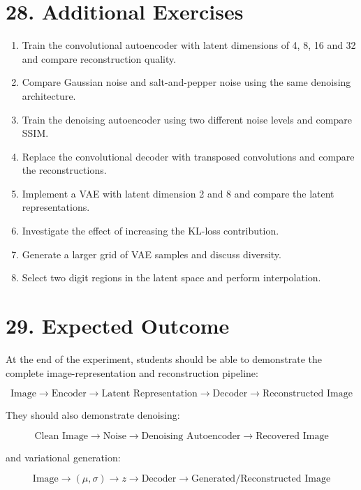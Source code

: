 \documentclass[10pt]{article}
\begin{document}
\section*{28. Additional Exercises}

\begin{enumerate}
\item Train the convolutional autoencoder with latent dimensions of 4, 8, 16
and 32 and compare reconstruction quality.
\item Compare Gaussian noise and salt-and-pepper noise using the same denoising
architecture.
\item Train the denoising autoencoder using two different noise levels and
compare SSIM.
\item Replace the convolutional decoder with transposed convolutions and
compare the reconstructions.
\item Implement a VAE with latent dimension 2 and 8 and compare the latent
representations.
\item Investigate the effect of increasing the KL-loss contribution.
\item Generate a larger grid of VAE samples and discuss diversity.
\item Select two digit regions in the latent space and perform interpolation.
\end{enumerate}

\section*{29. Expected Outcome}

At the end of the experiment, students should be able to demonstrate the
complete image-representation and reconstruction pipeline:

\[
\boxed{
\text{Image}
\rightarrow
\text{Encoder}
\rightarrow
\text{Latent Representation}
\rightarrow
\text{Decoder}
\rightarrow
\text{Reconstructed Image}
}
\]

They should also demonstrate denoising:

\[
\boxed{
\text{Clean Image}
\rightarrow
\text{Noise}
\rightarrow
\text{Denoising Autoencoder}
\rightarrow
\text{Recovered Image}
}
\]

and variational generation:

\[
\boxed{
\text{Image}
\rightarrow
(\mu,\sigma)
\rightarrow
z
\rightarrow
\text{Decoder}
\rightarrow
\text{Generated/Reconstructed Image}
}
\]
\end{document}

